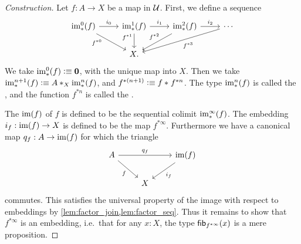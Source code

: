 \begin{proof}[Construction]
Let $f:A\to X$ be a map in $\UU$.
First, we define a sequence
\begin{equation*}
\begin{tikzcd}
\im_\ast^0(f) \arrow[dr,swap,near start,"f^{\ast 0}"] \arrow[r,"i_{0}"] & \im_\ast^1(f) \arrow[d,swap,near start,"f^{\ast 1}"] \arrow[r,"i_1"] & \im_\ast^2(f) \arrow[dl,swap,"f^{\ast 2}" xshift=.5em] \arrow[r,"i_2"] & \cdots \arrow[dll,"f^{\ast 3}"] \\
& X.
\end{tikzcd}
\end{equation*}
We take $\im_\ast^0(f)\defeq \emptyt$, with the unique map into $X$. Then we take $\im_\ast^{n+1}(f)\defeq \join[X]{A}{\im_\ast^n(f)}$, and
$f^{\ast(n+1)}\defeq \join{f}{f^{\ast n}}$. The type $\im_\ast^n(f)$ is called the , 
and the function $f^{\ast n}$ is called the . 

The  $\im(f)$ of $f$ is defined to be the sequential colimit
$\im_\ast^\infty(f)$. 
The embedding $i_f:\im(f)\to X$ is defined to be the map $f^{\ast\infty}$. 
Furthermore we have a canonical map $q_f:A\to \im(f)$ for which the triangle
\begin{equation*}
\begin{tikzcd}
A \arrow[dr,swap,"f"] \arrow[rr,"q_f"] & & \im(f) \arrow[dl,"i_f"] \\
& X
\end{tikzcd}
\end{equation*}
commutes. This satisfies the universal property of the image with respect
to embeddings by \autoref{lem:factor_join,lem:factor_seq}. Thus it remains to show that
$f^{\ast\infty}$ is an embedding, i.e.~that for any $x:X$, the type $\fib{f^{\ast\infty}}{x}$ is a
mere proposition. 


\end{proof}
